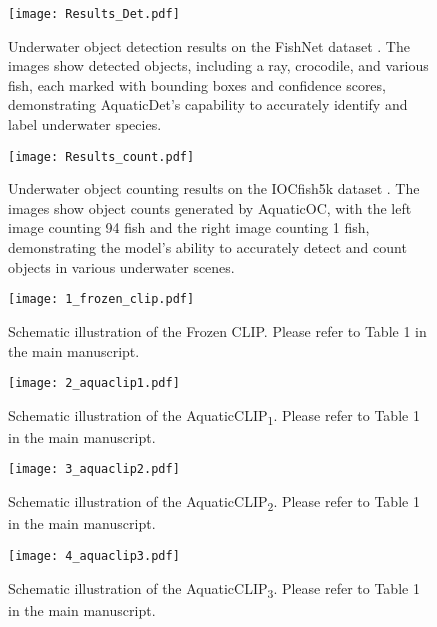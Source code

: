 \begin{figure}[t!]
\centering
\texttt{[image: Results\_Det.pdf]}
\caption{Underwater object detection results on the FishNet dataset \cite{khan2023fishnet}.
The images show detected objects, including a ray, crocodile, and various fish, each marked with bounding boxes and confidence scores, demonstrating AquaticDet’s capability to accurately identify and label underwater species.}
\label{fig:result_det}
\end{figure}

\begin{figure}[t!]
\centering
\texttt{[image: Results\_count.pdf]}
\caption{Underwater object counting results on the IOCfish5k dataset \cite{sun2023indiscernible}.
The images show object counts generated by AquaticOC, with the left image counting 94 fish and the right image counting 1 fish, demonstrating the model’s ability to accurately detect and count objects in various underwater scenes.}
\label{fig:result_count}
\end{figure}












\begin{figure*}[t!]
\centering
\texttt{[image: 1\_frozen\_clip.pdf]}
\caption{Schematic illustration of the Frozen CLIP. Please refer to Table 1 in the main manuscript.}
\label{fig:frozen_clip}
\end{figure*}

\begin{figure*}[t!]
\centering
\texttt{[image: 2\_aquaclip1.pdf]}
\caption{Schematic illustration of the AquaticCLIP\textsubscript{1}. Please refer to Table 1 in the main manuscript.}
\label{fig:aquatic_clip1}
\end{figure*}

\begin{figure*}[t!]
\centering
\texttt{[image: 3\_aquaclip2.pdf]}
\caption{Schematic illustration of the AquaticCLIP\textsubscript{2}. Please refer to Table 1 in the main manuscript.}
\label{fig:aquatic_clip2}
\end{figure*}

\begin{figure*}[t!]
\centering
\texttt{[image: 4\_aquaclip3.pdf]}
\caption{Schematic illustration of the AquaticCLIP\textsubscript{3}. Please refer to Table 1 in the main manuscript.}
\label{fig:aquatic_clip3}
\end{figure*}

